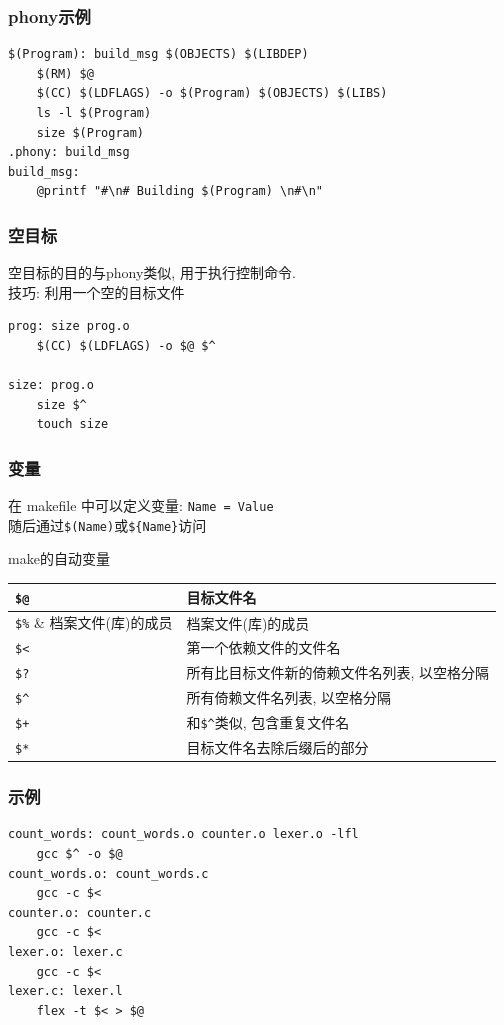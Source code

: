 \documentclass[compress]{beamer}
\begin{document}
\begin{frame}[containsverbatim]
\frametitle{phony示例}
\begin{Verbatim}[showtabs=true]
$(Program): build_msg $(OBJECTS) $(LIBDEP)
	$(RM) $@
	$(CC) $(LDFLAGS) -o $(Program) $(OBJECTS) $(LIBS)
	ls -l $(Program)
	size $(Program)
.phony: build_msg
build_msg:
	@printf "#\n# Building $(Program) \n#\n"
\end{Verbatim}
\end{frame}

\begin{frame}[containsverbatim]
\frametitle{空目标}

空目标的目的与phony类似, 用于执行控制命令. \\
技巧: 利用一个空的目标文件\\

\begin{Verbatim}[showtabs=true]
prog: size prog.o
	$(CC) $(LDFLAGS) -o $@ $^

size: prog.o
	size $^
	touch size
\end{Verbatim}
\end{frame}

\begin{frame}[containsverbatim]
\frametitle{变量}

在 makefile 中可以定义变量: \verb~Name = Value~\\
随后通过\verb~$(Name)~或\verb~${Name}~访问

make的自动变量\\[1ex]
{\footnotesize
\begin{tabular}{|l|l|} \hline
\verb~$@~ & 目标文件名 \\ \hline
\verb~$%~ & 档案文件(库)的成员 \\ \hline
\verb~$<~ & 第一个依赖文件的文件名 \\ \hline
\verb~$?~ & 所有比目标文件新的倚赖文件名列表, 以空格分隔 \\ \hline
\verb~$^~ & 所有倚赖文件名列表, 以空格分隔 \\ \hline
\verb~$+~ & 和\verb~$^~类似, 包含重复文件名 \\ \hline
\verb~$*~ & 目标文件名去除后缀后的部分\\ \hline
\end{tabular}
}


\end{frame}

\begin{frame}[containsverbatim]
\frametitle{示例}
\begin{Verbatim}[showtabs=true, label=makefile]
count_words: count_words.o counter.o lexer.o -lfl
	gcc $^ -o $@
count_words.o: count_words.c
	gcc -c $<
counter.o: counter.c
	gcc -c $<
lexer.o: lexer.c
	gcc -c $<
lexer.c: lexer.l
	flex -t $< > $@
\end{Verbatim}


\end{frame}
\end{document}
